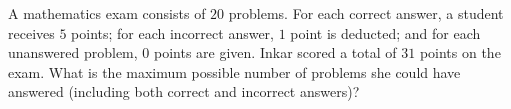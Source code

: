 A mathematics exam consists of $20$ problems. For each correct answer, a student receives $5$ points; for each incorrect answer, $1$ point is deducted; and for each unanswered problem, $0$ points are given. Inkar scored a total of $31$ points on the exam. What is the maximum possible number of problems she could have answered (including both correct and incorrect answers)?
